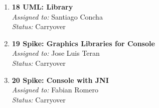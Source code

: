 \documentclass{article}
\begin{document}
\begin{enumerate}
    \item \textbf{18 UML: Library} \\
    \textit{Assigned to:} Santiago Concha \\
    \textit{Status:} Carryover 
    \item \textbf{19 Spike: Graphics Libraries for Console} \\
    \textit{Assigned to:} Jose Luis Teran\\
    \textit{Status:} Carryover
    \item \textbf{20 Spike: Console with JNI} \\
    \textit{Assigned to:} Fabian Romero\\
    \textit{Status:} Carryover
\end{enumerate}
\end{document}
